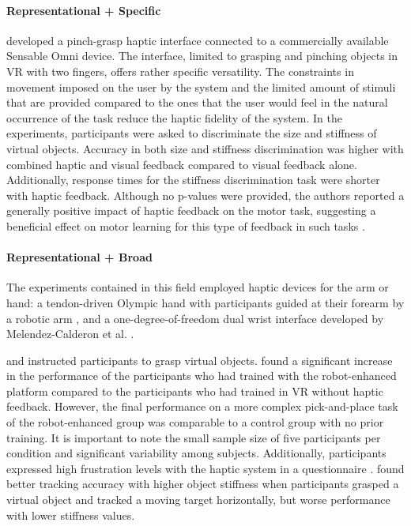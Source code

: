 \paragraph{Representational + Specific} \label{sec:representationalspecific}
\cite{Najdovski2020} developed a pinch-grasp haptic interface connected to a commercially available Sensable Omni device. The interface, limited to grasping and pinching objects in VR with two fingers, offers rather specific versatility. The constraints in movement imposed on the user by the system and the limited amount of stimuli that are provided compared to the ones that the user would feel in the natural occurrence of the task reduce the haptic fidelity of the system. 
In the experiments, participants were asked to discriminate the size and stiffness of virtual objects. Accuracy in both size and stiffness discrimination was higher with combined haptic and visual feedback compared to visual feedback alone. Additionally, response times for the stiffness discrimination task were shorter with haptic feedback. Although no p-values were provided, the authors reported a generally positive impact of haptic feedback on the motor task, suggesting a beneficial effect on motor learning for this type of feedback in such tasks \cite{Najdovski2020}. 

\paragraph{Representational + Broad} \label{sec:representationalbroad}
The experiments contained in this field employed haptic devices for the arm or hand: a tendon-driven Olympic hand with participants guided at their forearm by a robotic arm \cite{Chappell2022}, and a one-degree-of-freedom dual wrist interface \cite{Perez2023} developed by Melendez-Calderon et al. \cite{Melendez-Calderon2011Hi5:Control}.

\cite{Chappell2022} and \cite{Perez2023} instructed participants to grasp virtual objects.
\cite{Chappell2022} found a significant increase in the performance of the participants who had trained with the robot-enhanced platform compared to the participants who had trained in VR without haptic feedback. However, the final performance on a more complex pick-and-place task of the robot-enhanced group was comparable to a control group with no prior training. It is important to note the small sample size of five participants per condition and significant variability among subjects. Additionally, participants expressed high frustration levels with the haptic system in a questionnaire \cite{Chappell2022}.
\cite{Perez2023} found better tracking accuracy with higher object stiffness when participants grasped a virtual object and tracked a moving target horizontally, but worse performance with lower stiffness values. 


